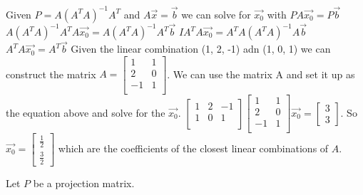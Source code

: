 \documentclass[]{exam}
\begin{document}
\begin{questions}
	\begin{solution}
		Given $P=A(A^TA)^{-1}A^T$ and $A\vec{x}=\vec{b}$ we can solve for $\vec{x_0}$ with $PA\vec{x_0}=P\vec{b}$
		\newline
		$A(A^TA)^{-1}A^TA\vec{x_0}=A(A^TA)^{-1}A^T\vec{b}$
	    \newline
	    $IA^TA\vec{x_0}=A^TA(A^TA)^{-1}A\vec{b}$
	    \newline
	    $A^TA\vec{x_0}=A^T\vec{b}$
	    \newline
	    Given the linear combination (1, 2, -1) adn (1, 0, 1) we can construct the matrix $A=\begin{bmatrix}
	        1 & 1 \\
	        2 & 0 \\
	        -1 & 1 \\
	    \end{bmatrix}$.
	    We can use the matrix A and set it up as the equation above and solve for the $\vec{x_0}$.
	    \newline
	    $\begin{bmatrix}
	        1 & 2 & -1 \\
	        1 & 0 & 1 \\
	    \end{bmatrix}
	    \begin{bmatrix}
	        1 & 1 \\
	        2 & 0 \\
	        -1 & 1 \\
	    \end{bmatrix}\vec{x_0}=\begin{bmatrix}
	        3 \\ 3
	    \end{bmatrix}$.
	    So $\vec{x_0}=\begin{bmatrix}
	        \frac{1}{2} \\ \frac{3}{2}
	    \end{bmatrix}$ which are the coefficients of the closest linear combinations of $A$.
	\end{solution}
	\question Let $P$ be a projection matrix. 
	
	\begin{parts}

\end{parts}
\end{questions}
\end{document}
